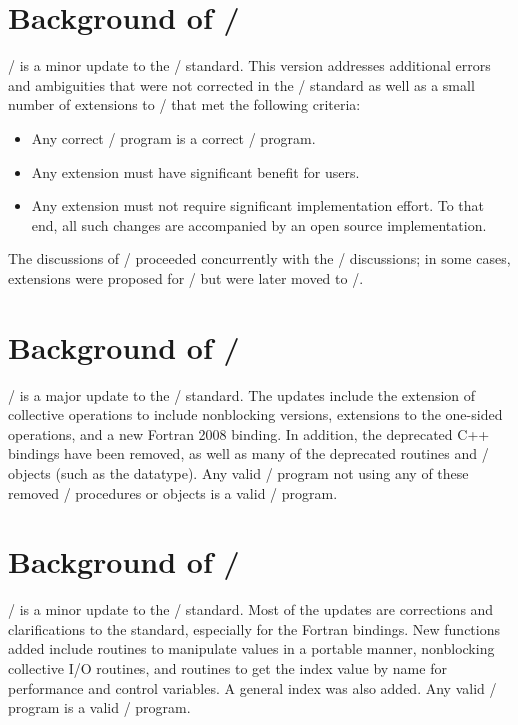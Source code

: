 \section{Background of \texorpdfstring{\MPIIIDOTII/}{MPI-2.2}}
\MPIIIDOTII/ is a minor update to the \MPIIIDOTI/ standard.  This version
addresses additional errors and ambiguities that were not corrected in
the \MPIIIDOTI/ standard as well as a small number of extensions to
\MPIIIDOTI/ that met the following criteria:
\begin{itemize}
\item Any correct \MPIIIDOTI/ program is a correct \MPIIIDOTII/ program.
\item Any extension must have significant benefit for users.
\item Any extension must not require significant implementation
  effort.  To that end, all such changes are accompanied by an open
  source implementation.
\end{itemize}
The discussions of \MPIIIDOTII/ proceeded concurrently with the \MPIIII/
discussions; in some cases, extensions were proposed for \MPIIIDOTII/ but
were later moved to \MPIIII/.

\section{Background of \texorpdfstring{\MPIIIIDOTO/}{MPI-3.0}}
\MPIIIIDOTO/ is a major update to the \MPI/ standard.  The updates include
the extension of collective operations to
include nonblocking versions, extensions to the one-sided operations, and
a new Fortran 2008 binding.  In addition, the deprecated C++ bindings
have been removed, as well as many of the deprecated routines and \MPI/
objects (such as the  datatype). Any valid \MPIIIDOTII/
program not using any of these removed \MPI/ procedures or objects is a valid
\MPIIIIDOTO/ program.

\section{Background of \texorpdfstring{\MPIIIIDOTI/}{MPI-3.1}}
\MPIIIIDOTI/ is a minor update to the \MPI/ standard.  Most of the updates
are corrections and clarifications to the standard,
especially for the Fortran bindings.  New functions added
include routines to manipulate  values in a portable manner, nonblocking
collective I/O routines, and routines to get the index value by name for
 performance and control variables.
A general index was also added. Any valid \MPIIIIDOTO/ program is a valid
\MPIIIIDOTI/ program.

